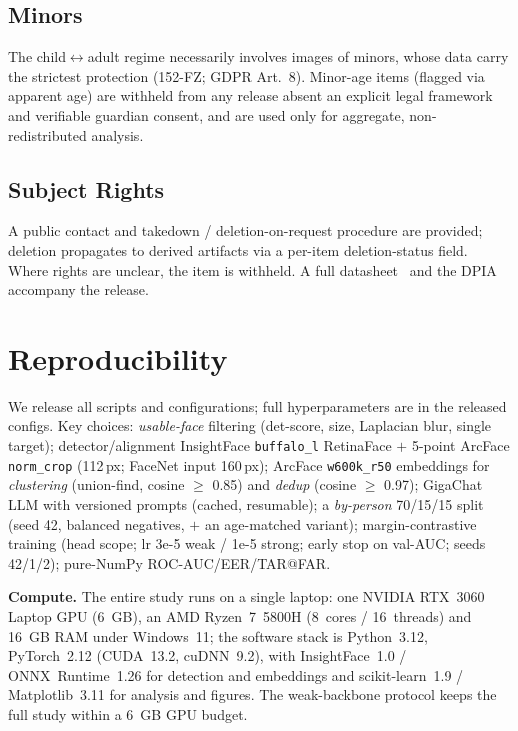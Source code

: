 \documentclass[journal]{IEEEtran}
\begin{document}
\subsection{Minors}\label{sec:eth-minors}
The child$\leftrightarrow$adult regime necessarily involves images of minors, whose data carry the strictest protection (152-FZ; GDPR Art.~8). Minor-age items (flagged via apparent age) are withheld from any release absent an explicit legal framework and verifiable guardian consent, and are used only for aggregate, non-redistributed analysis.

\subsection{Subject Rights}\label{sec:eth-rights}
A public contact and takedown / deletion-on-request procedure are provided; deletion propagates to derived artifacts via a per-item deletion-status field. Where rights are unclear, the item is withheld. A full datasheet~\cite{gebru2021datasheets} and the DPIA accompany the release.

\section{Reproducibility}\label{sec:repro}
We release all scripts and configurations; full hyperparameters are in the released configs. Key choices: \emph{usable-face} filtering (det-score, size, Laplacian blur, single target); detector/alignment InsightFace \texttt{buffalo\_l} RetinaFace $+$ 5-point ArcFace \texttt{norm\_crop} (112\,px; FaceNet input 160\,px); ArcFace \texttt{w600k\_r50} embeddings for \emph{clustering} (union-find, cosine $\geq$ 0.85) and \emph{dedup} (cosine $\geq$ 0.97); GigaChat LLM with versioned prompts (cached, resumable); a \emph{by-person} 70/15/15 split (seed 42, balanced negatives, $+$ an age-matched variant); margin-contrastive training (head scope; lr 3e-5 weak / 1e-5 strong; early stop on val-AUC; seeds 42/1/2); pure-NumPy ROC-AUC/EER/TAR@FAR.

\textbf{Compute.} The entire study runs on a single laptop: one NVIDIA RTX~3060 Laptop GPU (6~GB), an AMD Ryzen~7~5800H (8~cores / 16~threads) and 16~GB RAM under Windows~11; the software stack is Python~3.12, PyTorch~2.12 (CUDA~13.2, cuDNN~9.2), with InsightFace~1.0 / ONNX~Runtime~1.26 for detection and embeddings and scikit-learn~1.9 / Matplotlib~3.11 for analysis and figures. The weak-backbone protocol keeps the full study within a 6~GB GPU budget.
\end{document}
